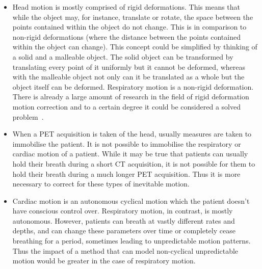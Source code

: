         \begin{itemize}
            \item Head motion is mostly comprised of rigid deformations. This means that while the object may, for instance, translate or rotate, the space between the points contained within the object do not change. This is in comparison to non-rigid deformations (where the distance between the points contained within the object can change). This concept could be simplified by thinking of a solid and a malleable object. The solid object can be transformed by translating every point of it uniformly but it cannot be deformed, whereas with the malleable object not only can it be translated as a whole but the object itself can be deformed. Respiratory motion is a non-rigid deformation. There is already a large amount of research in the field of rigid deformation motion correction and to a certain degree it could be considered a solved problem~\parencite{Hill2001}.
                
            \item When a \gls{PET} acquisition is taken of the head, usually measures are taken to immobilise the patient. It is not possible to immobilise the respiratory or cardiac motion of a patient. While it may be true that patients can usually hold their breath during a short \gls{CT} acquisition, it is not possible for them to hold their breath during a much longer \gls{PET} acquisition. Thus it is more necessary to correct for these types of inevitable motion.
    
            \item Cardiac motion is an autonomous cyclical motion which the patient doesn't have conscious control over. Respiratory motion, in contrast, is mostly autonomous. However, patients can breath at vastly different rates and depths, and can change these parameters over time or completely cease breathing for a period, sometimes leading to unpredictable motion patterns. %
            Thus the impact of a method that can model non-cyclical unpredictable motion would be greater in the case of respiratory motion.
        \end{itemize}
    
